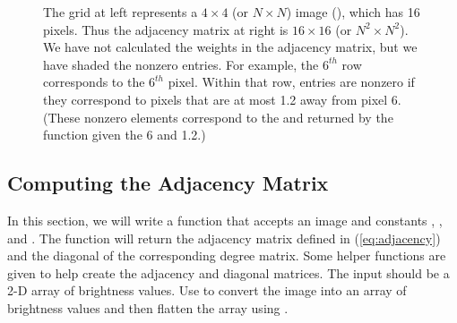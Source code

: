 \begin{figure}

\caption{The grid at left represents a $4\times4$ (or $N \times N$) image (), which has 16 pixels. Thus the adjacency matrix at right is $16 \times 16$ (or $N^{2} \times N^{2}$). We have not calculated the weights in the adjacency matrix, but we have shaded the nonzero entries. For example, the $6^{th}$ row corresponds to the $6^{th}$ pixel. Within that row, entries are nonzero if they correspond to pixels that are at most 1.2 away from pixel 6. (These nonzero elements correspond to the  and  returned by the  function given the  6 and  1.2.)}
\label{fig:adjacency}
\end{figure}


\subsection*{Computing the Adjacency Matrix}
In this section, we will write a function that accepts an image  and constants , , and . The function will return the adjacency matrix defined in (\ref{eq:adjacency}) and the diagonal of the corresponding degree matrix. Some helper functions are given to help create the adjacency and diagonal matrices.  The input  should be a 2-D array of brightness values.  Use  to convert the image into an array of brightness values and then flatten the array using .


